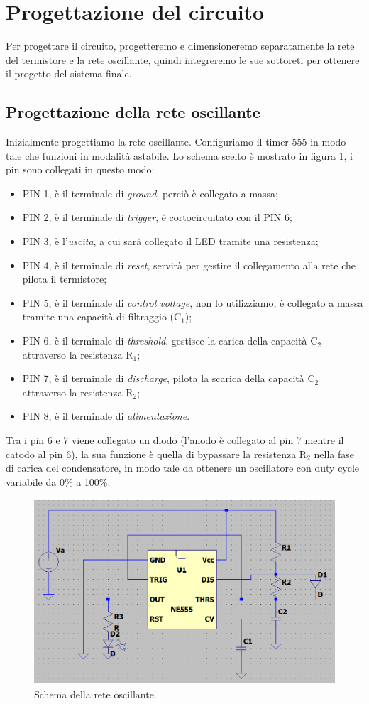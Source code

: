 \documentclass{report}
\begin{document}
\newpage
\section{Progettazione del circuito}
Per progettare il circuito, progetteremo e dimensioneremo separatamente la rete del termistore e la rete oscillante, quindi integreremo le sue sottoreti per ottenere il progetto del sistema finale.
\subsection{Progettazione della rete oscillante}
Inizialmente progettiamo la rete oscillante. Configuriamo il timer 555 in modo tale che funzioni in modalità astabile. Lo schema scelto è mostrato in figura \ref{figura:schema555}, i pin sono collegati in questo modo:
\begin{itemize}
\item PIN 1, è il terminale di \textit{ground}, perciò è collegato a massa;
\item PIN 2, è il terminale di \textit{trigger}, è cortocircuitato con il PIN 6;
\item PIN 3, è l'\textit{uscita}, a cui sarà collegato il LED tramite una resistenza;
\item PIN 4, è il terminale di \textit{reset}, servirà per gestire il collegamento alla rete che pilota il termistore;
\item PIN 5, è il terminale di \textit{control voltage}, non lo utilizziamo, è collegato a massa tramite una capacità di filtraggio ($\mathrm{C_1}$);
\item PIN 6, è il terminale di \textit{threshold}, gestisce la carica della capacità $\mathrm{C_2}$ attraverso la resistenza $\mathrm{R_1}$;
\item PIN 7, è il terminale di \textit{discharge}, pilota la scarica della capacità $\mathrm{C_2}$ attraverso la resistenza $\mathrm{R_2}$;
\item PIN 8, è il terminale di \textit{alimentazione}. 
\end{itemize} 
Tra i pin 6 e 7 viene collegato un diodo (l'anodo è collegato al pin 7 mentre il catodo al pin 6), la sua funzione è quella di bypassare la resistenza $\mathrm{R_2}$ nella fase di carica del condensatore, in modo tale da ottenere un oscillatore con duty cycle variabile da 0\% a 100\%. 
\begin{figure}[h!]
	\centering
	\includegraphics[height=6.9cm]{immagini/schema555}
	\caption{Schema della rete oscillante.} 
	\label{figura:schema555}
\end{figure}
\end{document}

